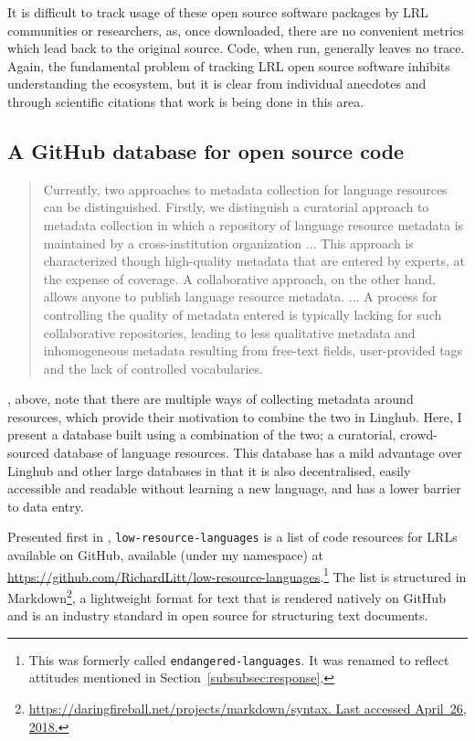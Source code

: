 It is difficult to track usage of these open source software packages by LRL communities or researchers, as, once downloaded, there are no convenient metrics which lead back to the original source. Code, when run, generally leaves no trace. Again, the fundamental problem of tracking LRL open source software inhibits understanding the ecosystem, but it is clear from individual anecdotes and through scientific citations that work is being done in this area.

\subsection{A GitHub database for open source code}
\label{sec:solutions}

\begin{quote}
Currently, two approaches to metadata collection for language resources can be distinguished. Firstly, we distinguish a curatorial approach to metadata collection in which a repository of language resource metadata is maintained by a cross-institution organization ... This approach is characterized though high-quality metadata that are entered by experts, at the expense of coverage. A collaborative approach, on the other hand, allows anyone to publish language resource metadata. ... A process for controlling the quality of metadata entered is typically lacking for such collaborative repositories, leading to less qualitative metadata and inhomogeneous metadata resulting from free-text fields, user-provided tags and the lack of controlled vocabularies.
\end{quote}

\citet{mccrae2015linghub}, above, note that there are multiple ways of collecting metadata around resources, which provide their motivation to combine the two in Linghub. Here, I present a database built using a combination of the two; a curatorial, crowd-sourced database of language resources. This database has a mild advantage over Linghub and other large databases in that it is also decentralised, easily accessible and readable without learning a new language, and has a lower barrier to data entry.

Presented first in \citet{CCURL}, {\tt low-resource-languages} is a list of code resources for LRLs available on GitHub, available (under my namespace) at \href{https://github.com/RichardLitt/low-resource-languages}{https://github.com/RichardLitt/low-resource-languages}.\footnote{This was formerly called {\tt endangered-languages}. It was renamed to reflect attitudes mentioned in Section~\ref{subsubsec:response}.} The list is structured in Markdown\footnote{\href{https://daringfireball.net/projects/markdown/syntax}{https://daringfireball.net/projects/markdown/syntax. Last accessed April~26, 2018.}}, a lightweight format for text that is rendered natively on GitHub and is an industry standard in open source for structuring text documents.

